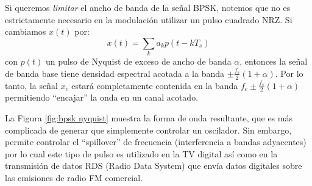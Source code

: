 \begin{ejemplo}\label{ej:bpsk nyquist}
    Si queremos \emph{limitar} el ancho de banda de la señal BPSK, notemos que no es estrictamente necesario en la modulación utilizar un pulso cuadrado NRZ. Si cambiamos $x(t)$ por:
    \begin{equation*}
        x(t) = \sum_k a_k p(t-kT_s)
    \end{equation*}
    con $p(t)$ un pulso de Nyquist de exceso de ancho de banda $\alpha$, entonces la señal de banda base tiene densidad espectral acotada a la banda $\pm \frac{f_s}{2}(1+\alpha)$. Por lo tanto, la señal $x_c$ estará completamente contenida en la banda $f_c\pm \frac{f_s}{2}(1+\alpha)$ permitiendo ``encajar'' la onda en un canal acotado.

    \begin{center}
    \end{center}

    La Figura \ref{fig:bpsk nyquist} muestra la forma de onda resultante, que es más complicada de generar que simplemente controlar un oscilador. Sin embargo, permite controlar el ``spillover'' de frecuencia (interferencia a bandas adyacentes) por lo cual este tipo de pulso es utilizado en la TV digital así como en la transmisión de datos RDS (Radio Data System) que envía datos digitales sobre las emisiones de radio FM comercial.
\end{ejemplo}
 
